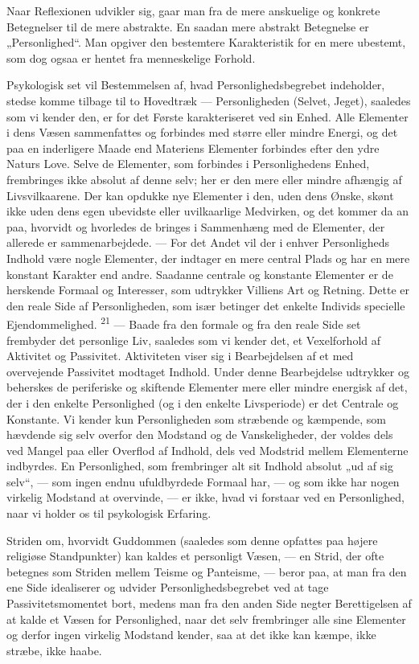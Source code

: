 \documentclass[12pt,a4paper,openany]{book}
\newcommand{\opage}[1]{\marginnote{\footnotesize\textit{[#1]}}}
\begin{document}
Naar Reflexionen udvikler sig, gaar man fra de mere anskuelige og
konkrete Betegnelser til de mere abstrakte. En saadan mere abstrakt
Betegnelse er „Personlighed“. Man opgiver den bestemtere Karakteristik
for en mere ubestemt, som dog ogsaa er hentet fra menneskelige Forhold.

Psykologisk set vil Bestemmelsen af, hvad Personlighedsbegrebet
indeholder, stedse komme tilbage til to Hovedtræk --- Personligheden
(Selvet, Jeget), saaledes som vi kender den, er for det Første
karakteriseret ved sin Enhed. Alle Elementer i dens Væsen sammenfattes
og forbindes med større eller mindre Energi, og det paa en inderligere
Maade end Materiens Elementer forbindes efter den ydre Naturs Love.
Selve de Elementer, som forbindes i Personlighedens Enhed, frembringes
ikke absolut af denne selv; her er den mere eller mindre afhængig af
Livsvilkaarene. Der kan opdukke nye Elementer i den, uden dens Ønske,
skønt ikke uden dens egen ubevidste eller uvilkaarlige Medvirken, og det
kommer da an paa, hvorvidt og hvorledes de bringes i Sammenhæng med de
Elementer, der allerede er sammenarbejdede. --- For det Andet vil der i
enhver Personligheds Indhold være nogle Elementer, der indtager en mere
central Plads og har en mere konstant Karakter end andre. Saadanne
centrale og konstante Elementer er de herskende Formaal og Interesser,
som udtrykker Villiens Art og Retning. Dette er den reale Side af
Personligheden, som især betinger det enkelte Individs specielle
Ejendommelighed. \textsuperscript{21} --- Baade fra den formale og fra
den reale Side set frembyder det personlige Liv, saaledes som vi kender
det, et Vexelforhold af Aktivitet og Passivitet. Aktiviteten viser sig i
Bearbejdelsen af et med overvejende Passivitet modtaget Indhold. Under
denne Bearbejdelse udtrykker og beherskes de periferiske og skiftende
Elementer mere eller mindre energisk af det, der i den enkelte
Personlighed (og i den enkelte Livsperiode) er det Centrale og
Konstante. Vi kender kun Personligheden som stræbende og kæmpende, som
hævdende sig selv
\opage{45}overfor den Modstand og de Vanskeligheder, der voldes dels ved
Mangel paa eller Overflod af Indhold, dels ved Modstrid mellem
Elementerne indbyrdes. En Personlighed, som frembringer alt sit Indhold
absolut „ud af sig selv“, --- som ingen endnu ufuldbyrdede Formaal har,
--- og som ikke har nogen virkelig Modstand at overvinde, --- er ikke,
hvad vi forstaar ved en Personlighed, naar vi holder os til psykologisk
Erfaring.

Striden om, hvorvidt Guddommen (saaledes som denne opfattes paa højere
religiøse Standpunkter) kan kaldes et personligt Væsen, --- en Strid,
der ofte betegnes som Striden mellem Teisme og Panteisme, --- beror paa,
at man fra den ene Side idealiserer og udvider Personlighedsbegrebet ved
at tage Passivitetsmomentet bort, medens man fra den anden Side negter
Berettigelsen af at kalde et Væsen for Personlighed, naar det selv
frembringer alle sine Elementer og derfor ingen virkelig Modstand
kender, saa at det ikke kan kæmpe, ikke stræbe, ikke haabe.
\end{document}
